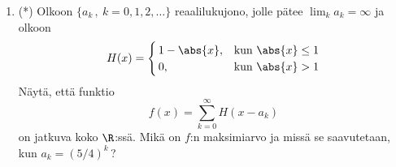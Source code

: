 \begin{enumerate}
\item (*) Olkoon $\{a_k\,,\ k=0,1,2,\ldots\}$ reaalilukujono, jolle pätee $\lim_k a_k=\infty$
ja olkoon
\[
H(x)= \begin{cases} 
      \,1-\abs{x}, &\text{kun}\ \abs{x} \le 1 \\ \,0, &\text{kun}\ \abs{x}>1
      \end{cases}
\]
Näytä, että funktio
\[
f(x)=\sum_{k=0}^\infty H(x-a_k)
\]
on jatkuva koko $\R$:ssä. Mikä on $f$:n maksimiarvo ja missä se saavutetaan, kun 
$a_k=(5/4)^k$\,? 



\end{enumerate}